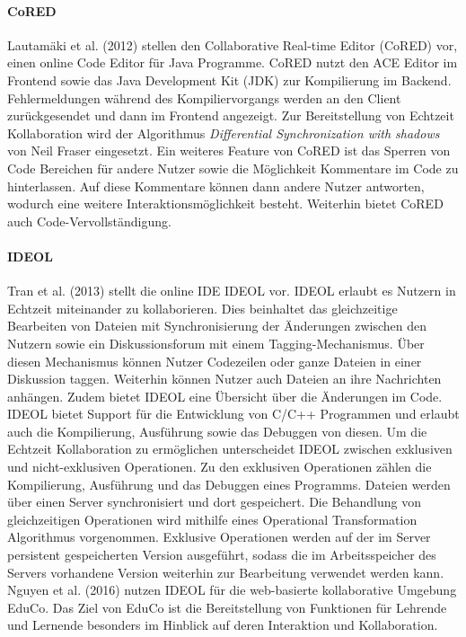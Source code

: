 \paragraph{CoRED}
Lautamäki et al. (2012) \cite{lautamaki_cored_2012} stellen den Collaborative Real-time Editor (CoRED) vor, einen online Code Editor für Java Programme. CoRED nutzt den ACE Editor \cite{noauthor_ace_nodate} im Frontend sowie das Java Development Kit (JDK) \cite{noauthor_jdk_nodate} zur Kompilierung im Backend. Fehlermeldungen während des Kompiliervorgangs werden an den Client zurückgesendet und dann im Frontend angezeigt. Zur Bereitstellung von Echtzeit Kollaboration wird der Algorithmus \textit{Differential Synchronization with shadows} \cite{fraser_differential_2009} von Neil Fraser eingesetzt. Ein weiteres Feature von CoRED ist das Sperren von Code Bereichen für andere Nutzer sowie die Möglichkeit Kommentare im Code zu hinterlassen. Auf diese Kommentare können dann andere Nutzer antworten, wodurch eine weitere Interaktionsmöglichkeit besteht. Weiterhin bietet CoRED auch Code-Vervollständigung.

\paragraph{IDEOL}
Tran et al. (2013) \cite{tran_interactive_2013} stellt die online IDE IDEOL vor. IDEOL erlaubt es Nutzern in Echtzeit miteinander zu kollaborieren. Dies beinhaltet das gleichzeitige Bearbeiten von Dateien mit Synchronisierung der Änderungen zwischen den Nutzern sowie ein Diskussionsforum mit einem Tagging-Mechanismus. Über diesen Mechanismus können Nutzer Codezeilen oder ganze Dateien in einer Diskussion taggen. Weiterhin können Nutzer auch Dateien an ihre Nachrichten anhängen. Zudem bietet IDEOL eine Übersicht über die Änderungen im Code. IDEOL bietet Support für die Entwicklung von C/C++ Programmen und erlaubt auch die Kompilierung, Ausführung sowie das Debuggen von diesen. Um die Echtzeit Kollaboration zu ermöglichen unterscheidet IDEOL zwischen exklusiven und nicht-exklusiven Operationen. Zu den exklusiven Operationen zählen die Kompilierung, Ausführung und das Debuggen eines Programms. Dateien werden über einen Server synchronisiert und dort gespeichert. Die Behandlung von gleichzeitigen Operationen wird mithilfe eines Operational Transformation Algorithmus \cite{sun_operational_1998} vorgenommen. Exklusive Operationen werden auf der im Server persistent gespeicherten Version ausgeführt, sodass die im Arbeitsspeicher des Servers vorhandene Version weiterhin zur Bearbeitung verwendet werden kann. Nguyen et al. (2016) \cite{nguyen_enhancing_2016} nutzen IDEOL für die web-basierte kollaborative Umgebung EduCo. Das Ziel von EduCo ist die Bereitstellung von Funktionen für Lehrende und Lernende besonders im Hinblick auf deren Interaktion und Kollaboration.

